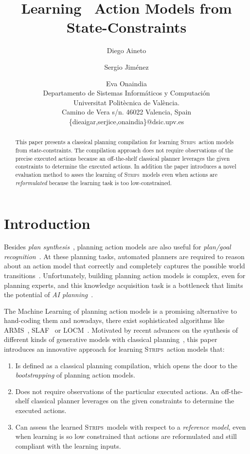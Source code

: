 \documentclass{article}
\title{Learning \strips\ Action Models from State-Constraints}
\author{Diego Aineto\and Sergio Jim\'enez\and Eva Onaindia\\
{\small Departamento de Sistemas Inform\'aticos y Computaci\'on}\\
{\small Universitat Polit\`ecnica de Val\`encia.}\\
{\small Camino de Vera s/n. 46022 Valencia, Spain}\\
{\small \{dieaigar,serjice,onaindia\}@dsic.upv.es}}
\newcommand{\strips}{\textsc{Strips}}     %
\begin{document}
\maketitle

\begin{abstract}
This paper presents a classical planning compilation for learning \strips\ action models from state-constraints. The compilation approach does not require observations of the precise executed actions because an off-the-shelf classical planner leverages the given constraints to determine the executed actions. In addition the paper introduces a novel evaluation method to asses the learning of \strips\ models even when actions are {\em reformulated} because the learning task is too low-constrained. 
\end{abstract}

\section{Introduction}
Besides {\em plan synthesis}~\cite{ghallab2004automated}, planning action models are also useful for {\em plan/goal recognition}~\cite{ramirez2012plan}. At these planning tasks, automated planners are required to reason about an action model that correctly and completely captures the possible world transitions~\cite{geffner:book:2013}. Unfortunately, building planning action models is complex, even for planning experts, and this knowledge acquisition task is a bottleneck that limits the potential of {\em AI planning}~\cite{kambhampati:modellite:AAAI2007}.

The Machine Learning of planning action models is a promising alternative to hand-coding them and nowadays, there exist sophisticated algorithms like {\sc ARMS}~\cite{yang2007learning}, {\sc SLAF}~\cite{amir:alearning:JAIR08} or {\sc LOCM}~\cite{cresswell2013acquiring}. Motivated by recent advances on the synthesis of different kinds of generative models with classical planning~\cite{bonet2009automatic,segovia2016hierarchical,segovia2017generating}, this paper introduces an innovative approach for learning \strips\ action models that:
\begin{enumerate}
\item Is defined as a classical planning compilation, which opens the door to the {\em bootstrapping} of planning action models.
\item Does not require observations of the particular executed actions. An off-the-shelf classical planner leverages on the given constraints to determine the executed actions.
\item Can assess the learned \strips\ models with respect to a {\em reference model}, even when learning is so low constrained that actions are reformulated and still compliant with the learning inputs. 
\end{enumerate}
 
\end{document}
